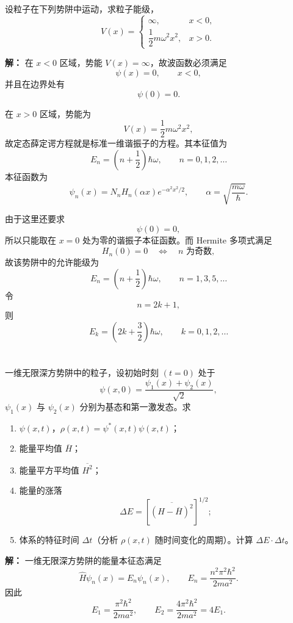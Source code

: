 \documentclass[12pt,a4paper]{article}
\begin{document}
\section{}
设粒子在下列势阱中运动，求粒子能级，
\[
V(x)=
\begin{cases}
\infty, & x<0,\\
\dfrac{1}{2}m\omega^2x^2, & x>0.
\end{cases}
\]

\vspace{0.5cm}

\noindent\textbf{解：}
在 \(x<0\) 区域，势能 \(V(x)=\infty\)，故波函数必须满足
\[
\psi(x)=0,\qquad x<0,
\]
并且在边界处有
\[
\psi(0)=0.
\]

在 \(x>0\) 区域，势能为
\[
V(x)=\frac{1}{2}m\omega^2x^2,
\]
故定态薛定谔方程就是标准一维谐振子的方程。其本征值为
\[
E_n=\left(n+\frac{1}{2}\right)\hbar\omega,
\qquad
n=0,1,2,\dots
\]
本征函数为
\[
\psi_n(x)=N_n H_n(\alpha x)e^{-\alpha^2x^2/2},
\qquad
\alpha=\sqrt{\frac{m\omega}{\hbar}}.
\]

由于这里还要求
\[
\psi(0)=0,
\]
所以只能取在 \(x=0\) 处为零的谐振子本征函数。而 Hermite 多项式满足
\[
H_n(0)=0 \quad \Longleftrightarrow \quad n \text{ 为奇数},
\]
故该势阱中的允许能级为
\[
E_n=\left(n+\frac{1}{2}\right)\hbar\omega,
\qquad n=1,3,5,\dots
\]
令
\[
n=2k+1,
\]
则
\[
E_k=\left(2k+\frac{3}{2}\right)\hbar\omega,
\qquad k=0,1,2,\dots
\]

\section{}
一维无限深方势阱中的粒子，设初始时刻 $(t=0)$ 处于
\[
\psi(x,0)=\frac{\psi_1(x)+\psi_2(x)}{\sqrt{2}},
\]
$\psi_1(x)$ 与 $\psi_2(x)$ 分别为基态和第一激发态。求
\begin{enumerate}[label=(\alph*)]
  \item $\psi(x,t)$，$\rho(x,t)=\psi^*(x,t)\psi(x,t)$；
  \item 能量平均值 $\overline{H}$；
  \item 能量平方平均值 $\overline{H^2}$；
  \item 能量的涨落
  \[
  \Delta E=\left[\overline{(H-\overline{H})^2}\right]^{1/2};
  \]
  \item 体系的特征时间 $\Delta t$（分析 $\rho(x,t)$ 随时间变化的周期）。计算 $\Delta E\cdot\Delta t$。
\end{enumerate}


\vspace{0.5cm}

\noindent\textbf{解：}
一维无限深方势阱的能量本征态满足
\[
\hat{H}\psi_n(x)=E_n\psi_n(x),
\qquad
E_n=\frac{n^2\pi^2\hbar^2}{2ma^2}.
\]
因此
\[
E_1=\frac{\pi^2\hbar^2}{2ma^2},
\qquad
E_2=\frac{4\pi^2\hbar^2}{2ma^2}=4E_1.
\]
\end{document}
